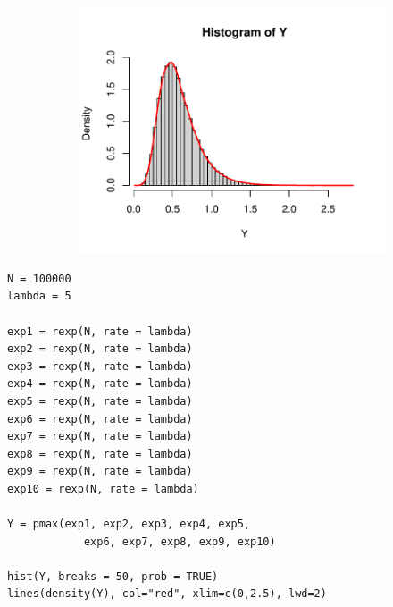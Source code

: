 \begin{figure}[H]
    \begin{minipage}{0.5\textwidth}
    \begin{center}
        \begin{figure}[H]
            \includegraphics[scale=0.7]{ch2_2.21.pdf}
            \end{figure}
        \end{center}
    \end{minipage}
    \begin{minipage}{0.5\textwidth}
    \end{minipage}
\end{figure}

\newpage\noindent
\begin{lstlisting}[style=RSyntax, title=R]
N = 100000
lambda = 5

exp1 = rexp(N, rate = lambda)
exp2 = rexp(N, rate = lambda)
exp3 = rexp(N, rate = lambda)
exp4 = rexp(N, rate = lambda)
exp5 = rexp(N, rate = lambda)
exp6 = rexp(N, rate = lambda)
exp7 = rexp(N, rate = lambda)
exp8 = rexp(N, rate = lambda)
exp9 = rexp(N, rate = lambda)
exp10 = rexp(N, rate = lambda)

Y = pmax(exp1, exp2, exp3, exp4, exp5,
            exp6, exp7, exp8, exp9, exp10)

hist(Y, breaks = 50, prob = TRUE)
lines(density(Y), col="red", xlim=c(0,2.5), lwd=2)
\end{lstlisting}

